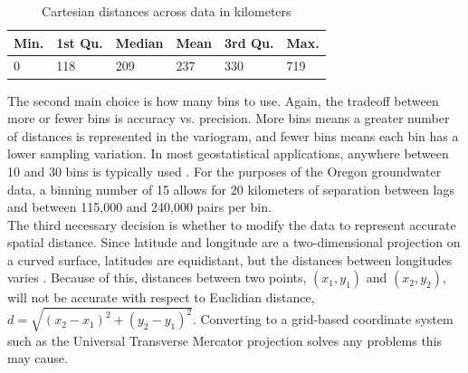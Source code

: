 \documentclass[12pt,twoside]{reedthesis}
\begin{document}
\begin{table}[h]

\centering

\begin{tabular}{l|l|l|l|l|l}

\hline
Min.  & 1st Qu.  & Median  &   Mean  & 3rd Qu.  &   Max. \\
\hline
  0 & 118 & 209 & 237 & 330 & 719 \\
\hline

\end{tabular}

\caption{Cartesian distances across data in kilometers}
\label{dists}

\end{table}
The second main choice is how many bins to use. Again, the tradeoff between more or fewer bins is accuracy vs. precision. More bins means a greater number of distances is represented in the variogram, and fewer bins means each bin has a lower sampling variation. In most geostatistical applications, anywhere between 10 and 30 bins is typically used \cite{gelfand:2010}. For the purposes of the Oregon groundwater data, a binning number of 15 allows for 20 kilometers of separation between lags and between 115,000 and 240,000 pairs per bin. \\

The third necessary decision is whether to modify the data to represent accurate spatial distance. Since latitude and longitude are a two-dimensional projection on a curved surface, latitudes are equidistant, but the distances between longitudes varies \cite{SpatialEpi}. Because of this, distances between two points, $(x_1, y_1)$ and $(x_2, y_2)$, will not be accurate with respect to Euclidian distance, $d = \sqrt{(x_2 - x_1)^2 + (y_2 - y_1)^2}$. Converting to a grid-based coordinate system such as the Universal Transverse Mercator projection solves any problems this may cause. 
\end{document}
